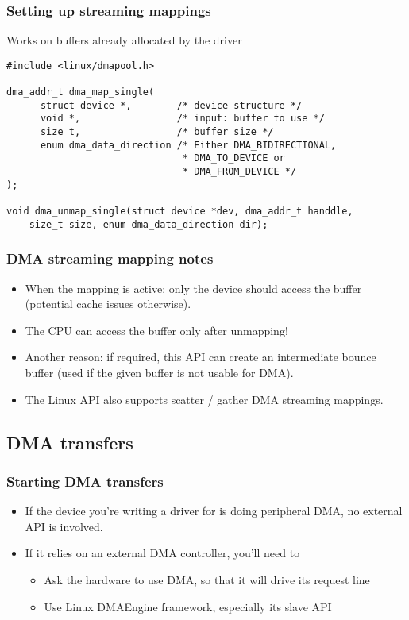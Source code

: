 \begin{frame}[fragile]
  \frametitle{Setting up streaming mappings}
  Works on buffers already allocated by the driver
\begin{verbatim}
#include <linux/dmapool.h>

dma_addr_t dma_map_single(
      struct device *,        /* device structure */
      void *,                 /* input: buffer to use */
      size_t,                 /* buffer size */
      enum dma_data_direction /* Either DMA_BIDIRECTIONAL,
                               * DMA_TO_DEVICE or
                               * DMA_FROM_DEVICE */
);

void dma_unmap_single(struct device *dev, dma_addr_t handdle,
    size_t size, enum dma_data_direction dir);
\end{verbatim}
\end{frame}

\begin{frame}
  \frametitle{DMA streaming mapping notes}
  \begin{itemize}
  \item When the mapping is active: only the device should access the
    buffer (potential cache issues otherwise).
  \item The CPU can access the buffer only after unmapping!
  \item Another reason: if required, this API can create an
    intermediate bounce buffer (used if the given buffer is not usable
    for DMA).
  \item The Linux API also supports scatter / gather DMA streaming
    mappings.
  \end{itemize}
\end{frame}

\subsection{DMA transfers}

\begin{frame}
  \frametitle{Starting DMA transfers}
  \begin{itemize}
  \item If the device you're writing a driver for is doing peripheral
    DMA, no external API is involved.
  \item If it relies on an external DMA controller, you'll need to
    \begin{itemize}
    \item Ask the hardware to use DMA, so that it will drive its
      request line
    \item Use Linux DMAEngine framework, especially its slave API
    \end{itemize}
  \end{itemize}
\end{frame}

